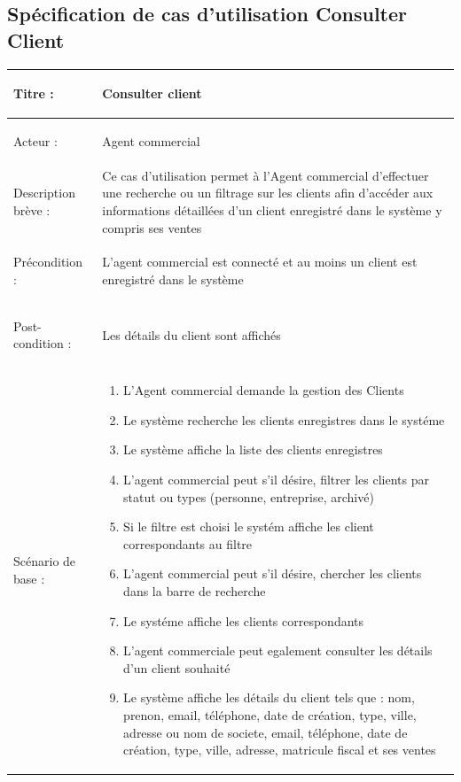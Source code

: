 \subsection{Spécification de cas d'utilisation Consulter Client}

\begin{longtable}{|>{\bfseries\raggedright\arraybackslash}p{3.5cm}|p{\dimexpr\textwidth-3.5cm-4\tabcolsep-2\arrayrulewidth}|}
\hline
Titre : & Consulter client \\
\hline
Acteur : & Agent commercial \\
\hline
Description brève : & Ce cas d'utilisation permet à l'Agent commercial d'effectuer une recherche ou un filtrage sur les clients afin d'accéder aux informations détaillées d'un client enregistré dans le système y compris ses ventes \\
\hline
Précondition : & L'agent commercial est connecté et au moins un client est enregistré dans le système \\
\hline
Post-condition : & Les détails du client sont affichés \\
\hline
Scénario de base : &
\begin{enumerate}[leftmargin=1.5em, topsep=2pt, itemsep=1pt]
  \item L'Agent commercial demande la gestion des Clients
  \item Le système recherche les clients enregistres dans le systéme
  \item Le système affiche la liste des clients enregistres
  \item L'agent commercial peut s'il désire, filtrer les clients par statut ou types (personne, entreprise, archivé)
  \item Si le filtre est choisi le systém affiche les client correspondants au filtre
  \item L'agent commercial peut s'il désire, chercher les clients dans la barre de recherche
  \item Le systéme affiche les clients correspondants
  \item L'agent commerciale peut egalement consulter les détails d'un client souhaité
  \item Le système affiche les détails du client tels que : nom, prenon, email, téléphone, date de création, type, ville, adresse ou nom de societe, email, téléphone, date de création, type, ville, adresse, matricule fiscal et ses ventes
\end{enumerate} \\

\end{longtable}
